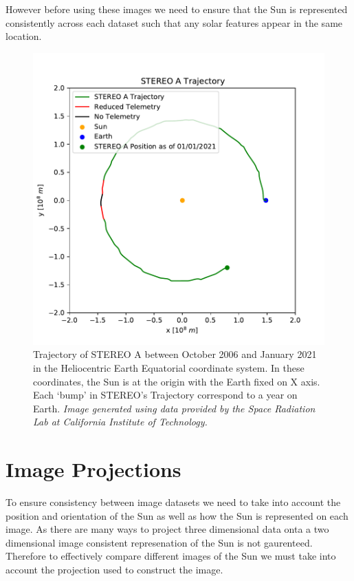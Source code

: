 \documentclass[11pt,a4paper,onecolumn]{report}
\begin{document}
However before using these images we need to ensure that the Sun is represented
consistently across each dataset such that any solar features appear in the
same location.

\begin{figure}[ht]
  \centering
  \includegraphics[width = 0.7\linewidth]{STEREO_pos.pdf}
  \caption[STEREO A Trajectory]{Trajectory of STEREO A between October 2006 and January 2021 in the
  Heliocentric Earth Equatorial coordinate system. In these coordinates, the Sun
  is at the origin with the Earth fixed on X axis. Each `bump' in STEREO's
  Trajectory correspond to a year on Earth. \textit{Image generated using
  data provided by the Space Radiation Lab at California Institute of Technology.}}
  \label{fig:stereo_pos}
\end{figure}


\section{Image Projections}
To ensure consistency between image datasets we need to take into account the
position and orientation of the Sun as well as how the Sun is represented on
each image. As there are many ways to project three dimensional data onta a two
dimensional image consistent represenation of the Sun is not gaurenteed.
Therefore to effectively compare different images of the Sun we must take into
account the projection used to construct the image.
\end{document}
